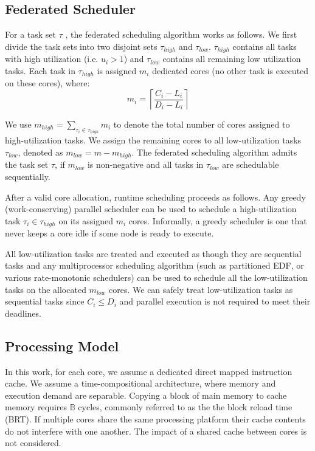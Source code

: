 \subsection{Federated Scheduler}
For a task set $\tau$ , the federated scheduling algorithm works as
follows. We first divide the task sets into two disjoint sets
$\tau_{high}$  and $\tau_{low}$. $\tau_{high}$ contains all tasks with
high utilization (i.e. $u_i > 1$) and $\tau_{low}$ contains all
remaining low utilization tasks. Each task in $\tau_{high}$ is
assigned $m_i$ dedicated cores (no other task is executed on these
cores), where: \begin{equation}\label{eq:m} m_i = \left\lceil \frac{C_i - L_i}{D_i - L_i}
\right\rceil \end{equation}

We use $m_{high} = \sum_{\tau_i \in \tau_{high}} m_i$ to denote the total
number of cores assigned to high-utilization tasks. We assign
the remaining cores to all low-utilization tasks $\tau_{low}$, denoted
as ${m_{low} = m - m_{high}}$. The federated scheduling algorithm admits
the task set ${\tau}$, if $m_{low}$ is non-negative and all tasks in
$\tau_{low}$ are schedulable sequentially.  

After a valid core allocation, runtime scheduling proceeds as
follows. Any greedy (work-conserving) parallel scheduler can be used
to schedule a high-utilization task $\tau_i \in \tau_{high}$ on its
assigned $m_i$ cores. Informally, a greedy scheduler is one that never
keeps a core idle if some node is ready to execute. 

All low-utilization tasks are treated and executed as though they are
sequential tasks and any multiprocessor scheduling algorithm (such as
partitioned EDF, or various rate-monotonic schedulers) can be used to
schedule all the low-utilization tasks on the allocated $m_{low}$
cores. We can safely treat low-utilization tasks as sequential tasks
since $C_i \le D_i$ and parallel execution is not required to meet their
deadlines. 

\subsection{Processing Model}

In this work, for each core, we assume a dedicated direct mapped
instruction cache. We assume a time-compositional architecture\addcite,
where memory and execution demand are separable. Copying a block of 
main memory to cache memory requires ${\mathbb{B}}$ cycles, commonly
referred to as the the block reload time (BRT). If multiple cores share
the same processing platform their cache contents do not interfere with
one another. The impact of a shared cache between cores is not considered.


